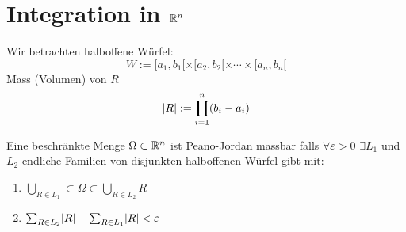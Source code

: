 \section{Integration in $\mathbb{R}^n$}
\begin{Def}
  Wir betrachten halboffene Würfel:
  \[W:= [a_1,b_1[\times [a_2,b_2[ \times \cdots\times [ a_n,b_n [ \]
  Mass (Volumen) von $R$
  \[\mathopen| R \mathclose|:=\prod_{i=1}^n(b_i-a_i)\]
\end{Def}
\begin{Def}
  Eine beschränkte Menge $\Omega\subset\mathbb{R}^n$ ist Peano-Jordan massbar falls $\forall \varepsilon>0$ $\exists L_1$ und $L_2$ endliche Familien von disjunkten halboffenen Würfel gibt mit:
  \begin{enumerate}
    \item $\bigcup_{R\in L_1}\subset\Omega\subset\bigcup_{R\in L_2}R$
    \item $\sum_{R\in L_2}\mathopen| R \mathclose|-\sum_{R\in L_1}\mathopen| R \mathclose|<\varepsilon$
  \end{enumerate}
\end{Def}
